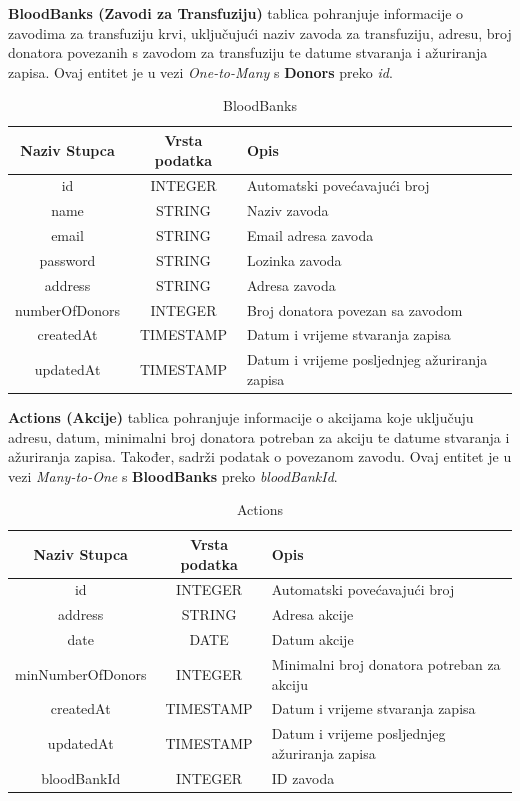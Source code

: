 \noindent
\textbf{BloodBanks (Zavodi za Transfuziju)} tablica pohranjuje informacije o
zavodima za transfuziju krvi, uključujući naziv zavoda za transfuziju, adresu,
broj donatora povezanih s zavodom za transfuziju te datume stvaranja i ažuriranja
zapisa. Ovaj entitet je u vezi \textit{One-to-Many} s \textbf{Donors} preko
\textit{id}.
\begin{table}[H]
	\renewcommand{\arraystretch}{2}
	\centering
	\begin{tabularx}
		{1\textwidth}{|c|c|X|} \hline \textbf{Naziv Stupca} & \textbf{Vrsta
		podatka} & \textbf{Opis} \\ \hline \cellcolor{LightGreen} id & INTEGER &
		Automatski povećavajući broj \\ \hline name & STRING & Naziv zavoda \\
		\hline email & STRING & Email adresa zavoda \\ \hline password & STRING &
		Lozinka zavoda \\ \hline address & STRING & Adresa zavoda \\ \hline
		numberOfDonors & INTEGER & Broj donatora povezan sa zavodom \\ \hline
		createdAt & TIMESTAMP & Datum i vrijeme stvaranja zapisa \\ \hline
		updatedAt & TIMESTAMP & Datum i vrijeme posljednjeg ažuriranja zapisa \\
		\hline
	\end{tabularx}
	\caption{BloodBanks}
	\label{tab:my_label}
\end{table}
\clearpage %

\noindent
\textbf{Actions (Akcije)} tablica pohranjuje informacije o akcijama koje uključuju
adresu, datum, minimalni broj donatora potreban za akciju te datume stvaranja i
ažuriranja zapisa. Također, sadrži podatak o povezanom zavodu. Ovaj entitet je
u vezi \textit{Many-to-One} s \textbf{BloodBanks} preko \textit{bloodBankId}.
\begin{table}[H]
	\renewcommand{\arraystretch}{2}
	\centering
	\begin{tabularx}
		{1\textwidth}{|c|c|X|} \hline \textbf{Naziv Stupca} & \textbf{Vrsta
		podatka} & \textbf{Opis} \\ \hline \cellcolor{LightGreen}id & INTEGER & Automatski
		povećavajući broj \\ \hline address & STRING & Adresa akcije \\ \hline date
		  & DATE & Datum akcije \\ \hline minNumberOfDonors & INTEGER & Minimalni broj
		donatora potreban za akciju \\ \hline createdAt & TIMESTAMP & Datum i vrijeme
		stvaranja zapisa \\ \hline updatedAt & TIMESTAMP & Datum i vrijeme posljednjeg
		ažuriranja zapisa \\ \hline \cellcolor{LightBlue} bloodBankId & INTEGER &
		ID zavoda \\ \hline
	\end{tabularx}
	\caption{Actions}
	\label{tab:my_label}
\end{table}
\clearpage %

